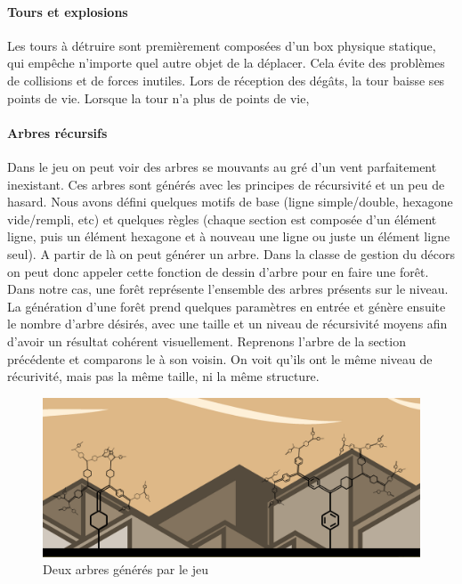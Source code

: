 \documentclass[a4paper,10pt]{article}
\begin{document}
  \paragraph{Tours et explosions}
  Les tours à détruire sont premièrement composées d'un box physique statique, qui empêche n'importe quel autre objet de la déplacer. Cela évite des problèmes de collisions et de forces inutiles. Lors de réception des dégâts, la tour baisse ses points de vie. Lorsque la tour n'a plus de points de vie, 
  
  \paragraph{Arbres récursifs}
  Dans le jeu on peut voir des arbres se mouvants au gré d'un vent parfaitement inexistant. Ces arbres sont générés avec les principes de récursivité et un peu de hasard. Nous avons défini quelques motifs de base (ligne simple/double, hexagone vide/rempli, etc) et quelques règles (chaque section est composée d'un élément ligne, puis un élément hexagone et à nouveau une ligne ou juste un élément ligne seul). A partir de là on peut générer un arbre.
\newline Dans la classe de gestion du décors on peut donc appeler cette fonction de dessin d'arbre pour en faire une forêt. Dans notre cas, une forêt représente l'ensemble des arbres présents sur le niveau. La génération d'une forêt prend quelques paramètres en entrée et génère ensuite le nombre d'arbre désirés, avec une taille et un niveau de récursivité moyens afin d'avoir un résultat cohérent visuellement.
  \newline Reprenons l'arbre de la section précédente et comparons le à son voisin. On voit qu'ils ont le même niveau de récurivité, mais pas la même taille, ni la même structure.
 \begin{figure}[!h]
 \centering
 \vspace{-10pt}
 \includegraphics[scale=0.3]{images/trees}
 \caption{Deux arbres générés par le jeu}
 \end{figure}
  
\end{document}
